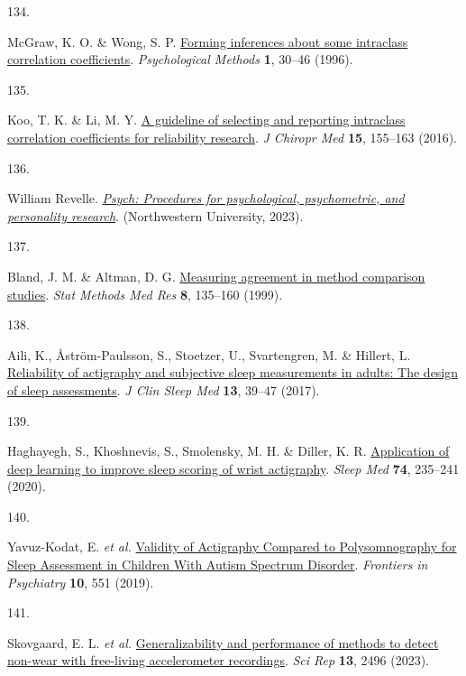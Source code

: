 \documentclass[
  10pt,
]{scrbook}
\newlength{\cslhangindent}
\newlength{\csllabelwidth}
\newlength{\cslentryspacingunit} %
\newenvironment{CSLReferences}[2] %
 {%
  \setlength{\parindent}{0pt}
  \ifodd #1
  \let\oldpar\par
  \def\par{\hangindent=\cslhangindent\oldpar}
  \fi
  \setlength{\parskip}{#2\cslentryspacingunit}
 }%
 {}
\newcommand{\CSLLeftMargin}[1]{\parbox[t]{\csllabelwidth}{#1}}
\newcommand{\CSLRightInline}[1]{\parbox[t]{\linewidth - \csllabelwidth}{#1}\break}
\let\originaltextbf\textbf
\renewcommand{\textbf}[1]{\textcolor{color1}{\textsf{\originaltextbf{#1}}}}
\begin{document}
\begin{CSLReferences}{0}{0}
\leavevmode{}%
\CSLLeftMargin{134. }%
\CSLRightInline{McGraw, K. O. \& Wong, S. P.
\href{https://doi.org/10.1037/1082-989X.1.1.30}{Forming inferences about
some intraclass correlation coefficients}. \emph{Psychological Methods}
\textbf{1}, 30--46 (1996).}

\leavevmode{}%
\CSLLeftMargin{135. }%
\CSLRightInline{Koo, T. K. \& Li, M. Y.
\href{https://doi.org/10.1016/j.jcm.2016.02.012}{A guideline of
selecting and reporting intraclass correlation coefficients for
reliability research}. \emph{J Chiropr Med} \textbf{15}, 155--163
(2016).}

\leavevmode{}%
\CSLLeftMargin{136. }%
\CSLRightInline{William Revelle.
\emph{\href{https://CRAN.R-project.org/package=psych}{Psych: Procedures
for psychological, psychometric, and personality research}}.
(Northwestern University, 2023).}

\leavevmode{}%
\CSLLeftMargin{137. }%
\CSLRightInline{Bland, J. M. \& Altman, D. G.
\href{https://doi.org/10.1177/096228029900800204}{Measuring agreement in
method comparison studies}. \emph{Stat Methods Med Res} \textbf{8},
135--160 (1999).}

\leavevmode{}%
\CSLLeftMargin{138. }%
\CSLRightInline{Aili, K., Åström-Paulsson, S., Stoetzer, U.,
Svartengren, M. \& Hillert, L.
\href{https://doi.org/10.5664/jcsm.6384}{Reliability of actigraphy and
subjective sleep measurements in adults: The design of sleep
assessments}. \emph{J Clin Sleep Med} \textbf{13}, 39--47 (2017).}

\leavevmode{}%
\CSLLeftMargin{139. }%
\CSLRightInline{Haghayegh, S., Khoshnevis, S., Smolensky, M. H. \&
Diller, K. R.
\href{https://doi.org/10.1016/j.sleep.2020.05.008}{Application of deep
learning to improve sleep scoring of wrist actigraphy}. \emph{Sleep Med}
\textbf{74}, 235--241 (2020).}

\leavevmode{}%
\CSLLeftMargin{140. }%
\CSLRightInline{Yavuz-Kodat, E. \emph{et al.}
\href{https://doi.org/10.3389/fpsyt.2019.00551}{Validity of Actigraphy
Compared to Polysomnography for Sleep Assessment in Children With Autism
Spectrum Disorder}. \emph{Frontiers in Psychiatry} \textbf{10}, 551
(2019).}

\leavevmode{}%
\CSLLeftMargin{141. }%
\CSLRightInline{Skovgaard, E. L. \emph{et al.}
\href{https://doi.org/10.1038/s41598-023-29666-x}{Generalizability and
performance of methods to detect non-wear with free-living accelerometer
recordings}. \emph{Sci Rep} \textbf{13}, 2496 (2023).}


\end{CSLReferences}
\end{document}
